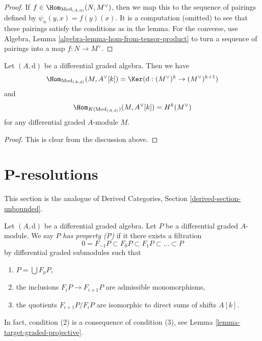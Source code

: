 \begin{proof}
If $f \in \Hom_{\text{Mod}_{(A, \text{d})}}(N, M^\vee)$, then we
map this to the sequence of pairings defined by
$\psi_n(y, x) = f(y)(x)$. It is a computation (omitted) to see
that these pairings satisfy the conditions as in the lemma.
For the converse, use
Algebra, Lemma \ref{algebra-lemma-hom-from-tensor-product} to turn a sequence
of pairings into a map $f : N \to M^\vee$.
\end{proof}

\begin{lemma}
\label{lemma-hom-into-shift-dual-free}
Let $(A, \text{d})$ be a differential graded algebra. Then we have
$$
\Hom_{\text{Mod}_{(A, \text{d})}}(M, A^\vee[k]) =
\Ker(\text{d} : (M^\vee)^k \to (M^\vee)^{k + 1})
$$
and
$$
\Hom_{K(\text{Mod}_{(A, \text{d})})}(M, A^\vee[k]) = H^k(M^\vee)
$$
for any differential graded $A$-module $M$.
\end{lemma}

\begin{proof}
This is clear from the discussion above.
\end{proof}















\section{P-resolutions}
\label{section-P-resolutions}

\noindent
This section is the analogue of
Derived Categories, Section \ref{derived-section-unbounded}.

\medskip\noindent
Let $(A, \text{d})$ be a differential graded algebra.
Let $P$ be a differential graded $A$-module. We say $P$
{\it has property (P)} if it there exists a filtration
$$
0 = F_{-1}P \subset F_0P \subset F_1P \subset \ldots \subset P
$$
by differential graded submodules such that
\begin{enumerate}
\item $P = \bigcup F_pP$,
\item the inclusions $F_iP \to F_{i + 1}P$ are admissible
monomorphisms,
\item the quotients $F_{i + 1}P/F_iP$ are isomorphic to direct
sums of shifts $A[k]$.
\end{enumerate}
In fact, condition (2) is a consequence of condition (3), see
Lemma \ref{lemma-target-graded-projective}.

